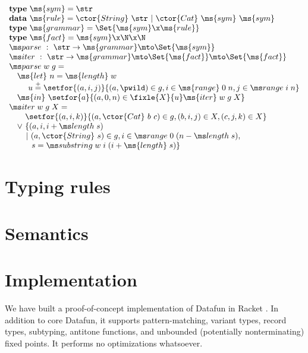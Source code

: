 \documentclass[preprint]{sigplanconf}
\newcommand{\uto}{\to}
\begin{document}
\[\begin{array}{l}
\mathbf{type}~\ms{sym} = \str\\
\mathbf{data}~\ms{rule} = \ctor{String}~\str ~|~ \ctor{Cat}~\ms{sym}~\ms{sym}\\
\mathbf{type}~\ms{grammar} = \Set{\ms{sym} \x \ms{rule}}\\
\mathbf{type}~\ms{fact} = \ms{sym} \x \N \x \N\\
\fname{parse} ~:~ \str \uto \ms{grammar} \mto \Set{\ms{sym}}\\
\fname{iter} ~:~ \str \uto \ms{grammar} \mto \Set{\ms{fact}}
\mto \Set{\ms{fact}}\\
\fname{parse}\;w\;g =\\
\hspace{1em} \ms{let}~ n = \ms{length}\;w\\
\hspace{2.375em}u \overset{+}{=}
  \setfor{(a,i,j)}{(a,\pwild) \in g, i \in \ms{range}\;0\;n,
  j\in\fname{range}\;i\;n}\\
\hspace{1em}\ms{in}~\setfor{a}{(a, 0, n) \in \fixle{X}{u} \ms{iter}\;w\;g\;X}\\
\fname{iter}\;w\;g\;X =\\
\hspace{1em}\phantom{\vee~}\setfor{(a,i,k)}{(a, \ctor{Cat}~b~c) \in g,
  (b,i,j) \in X, (c,j,k) \in X}\\
\hspace{1em}\vee~ \{(a,i,i+\fname{length}\;s)\\
\hspace{2.1em}|~ (a, \ctor{String}~s) \in g,
i \in \fname{range}\;0\;(n-\fname{length}\;s),\\
\hspace{2.2em}\phantom{|~} s = \fname{substring}\;w\;i\;(i+\ms{length}\;s)\}
\end{array}\]


\section{Typing rules}

\section{Semantics}

\section{Implementation}
We have built a proof-of-concept implementation of Datafun in Racket
. In addition to core Datafun, it supports pattern-matching, variant
types, record types, subtyping, antitone functions, and unbounded (potentially
nonterminating) fixed points. It performs no optimizations whatsoever.
\end{document}
